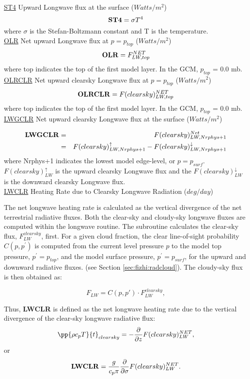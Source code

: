  
\noindent
{ \underline {ST4} Upward Longwave flux at the surface ($Watts/m^2$) }
\[
{\bf ST4} = \sigma T^4
\]
\noindent
where $\sigma$ is the Stefan-Boltzmann constant and T is the temperature.
\\
 
\noindent
{ \underline {OLR} Net upward Longwave flux at $p=p_{top}$ ($Watts/m^2$) }
\[
{\bf OLR}  =  F_{LW,top}^{NET}
\]
\noindent
where top indicates the top of the first model layer.
In the GCM, $p_{top}$ = 0.0 mb.
\\


\noindent
{ \underline {OLRCLR} Net upward clearsky Longwave flux at $p=p_{top}$ ($Watts/m^2$) }
\[
{\bf OLRCLR}  =  F(clearsky)_{LW,top}^{NET}
\]
\noindent
where top indicates the top of the first model layer.
In the GCM, $p_{top}$ = 0.0 mb.
\\

\noindent
{ \underline {LWGCLR} Net upward clearsky Longwave flux at the surface ($Watts/m^2$) }

\noindent
\begin{eqnarray*}
{\bf LWGCLR} & =  & F(clearsky)_{LW,Nrphys+1}^{Net} \\
             & =  & F(clearsky)_{LW,Nrphys+1}^\uparrow - F(clearsky)_{LW,Nrphys+1}^\downarrow
\end{eqnarray*}
where Nrphys+1 indicates the lowest model edge-level, or $p = p_{surf}$.
$F(clearsky)_{LW}^\uparrow$ is
the upward clearsky Longwave flux and the $F(clearsky)_{LW}^\downarrow$ is the downward clearsky Longwave flux.
\\

\noindent
{ \underline {LWCLR} Heating Rate due to Clearsky Longwave Radiation ($deg/day$) }

\noindent
The net longwave heating rate is calculated as the vertical divergence of the
net terrestrial radiative fluxes.
Both the clear-sky and cloudy-sky longwave fluxes are computed within the
longwave routine.
The subroutine calculates the clear-sky flux, $F^{clearsky}_{LW}$, first.
For a given cloud fraction,
the clear line-of-sight probability $C(p,p^{\prime})$ is computed from the current level pressure $p$ 
to the model top pressure, $p^{\prime} = p_{top}$, and the model surface pressure, $p^{\prime} = p_{surf}$,
for the upward and downward radiative fluxes.
(see Section \ref{sec:fizhi:radcloud}).
The cloudy-sky flux is then obtained as:
   
\noindent
\[
F_{LW} = C(p,p') \cdot F^{clearsky}_{LW},
\]

\noindent
Thus, {\bf LWCLR} is defined as the net longwave heating rate due to the 
vertical divergence of the
clear-sky longwave radiative flux:
\[
\pp{\rho c_p T}{t}_{clearsky} = - {\partial \over \partial z} F(clearsky)_{LW}^{NET} ,
\]
or
\[
{\bf LWCLR} = \frac{g}{c_p \pi} {\partial \over \partial \sigma} F(clearsky)_{LW}^{NET} .
\]

